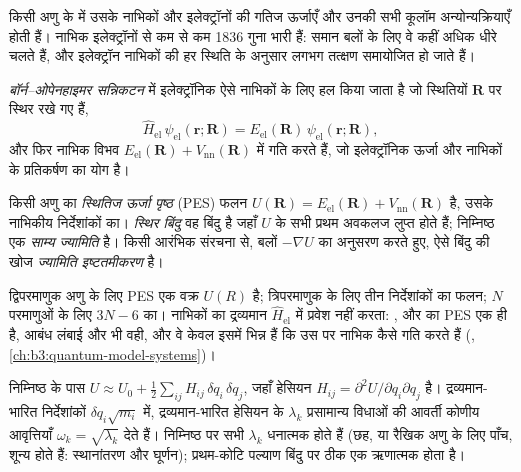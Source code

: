किसी अणु के  में उसके नाभिकों और इलेक्ट्रॉनों की गतिज ऊर्जाएँ
और उनकी सभी कूलॉम अन्योन्यक्रियाएँ होती हैं। नाभिक इलेक्ट्रॉनों से कम से कम 1836
गुना भारी हैं: समान बलों के लिए वे कहीं अधिक धीरे चलते हैं, और
इलेक्ट्रॉन नाभिकों की हर स्थिति के अनुसार लगभग तत्क्षण समायोजित हो जाते हैं।

\begin{definition}\label{def:b3:computational-chemistry:born-oppenheimer}
\emph{बॉर्न--ओपेनहाइमर सन्निकटन} में
इलेक्ट्रॉनिक  ऐसे नाभिकों के लिए हल किया जाता है जो
स्थितियों $\mathbf R$ पर स्थिर रखे गए हैं,
\[
\hat H_{\mathrm{el}}\,\psi_{\mathrm{el}}(\mathbf r;\mathbf R) =
E_{\mathrm{el}}(\mathbf R)\,\psi_{\mathrm{el}}(\mathbf r;\mathbf R),
\]
और फिर नाभिक विभव $E_{\mathrm{el}}(\mathbf R) +
V_{\mathrm{nn}}(\mathbf R)$ में गति करते हैं, जो इलेक्ट्रॉनिक ऊर्जा और नाभिकों
के प्रतिकर्षण का योग है।
\end{definition}

\begin{definition}\label{def:b3:computational-chemistry:pes}
किसी अणु का \emph{स्थितिज ऊर्जा पृष्ठ} (PES)
फलन $U(\mathbf R) = E_{\mathrm{el}}(\mathbf R) +
V_{\mathrm{nn}}(\mathbf R)$ है, उसके नाभिकीय निर्देशांकों का। \emph{स्थिर
बिंदु} वह बिंदु है जहाँ $U$ के सभी प्रथम अवकलज
लुप्त होते हैं; निम्निष्ठ एक \emph{साम्य ज्यामिति} है।
किसी आरंभिक संरचना से, बलों
$-\nabla U$ का अनुसरण करते हुए, ऐसे बिंदु की खोज \emph{ज्यामिति इष्टतमीकरण} है।
\end{definition}

द्विपरमाणुक अणु के लिए PES एक वक्र $U(R)$ है; त्रिपरमाणुक के लिए
तीन निर्देशांकों का फलन; $N$ परमाणुओं के लिए $3N - 6$ का। नाभिकों का
द्रव्यमान $\hat H_{\mathrm{el}}$ में प्रवेश नहीं करता: ,  और  का
PES एक ही है, आबंध लंबाई और  भी वही, और वे केवल इसमें भिन्न हैं कि
उस पर नाभिक कैसे गति करते हैं (, \cref{ch:b3:quantum-model-systems})।

\begin{proposition}[हेसियन से आवृत्तियाँ]\label{prop:b3:computational-chemistry:hessian}
निम्निष्ठ के पास $U \approx U_0 + \frac12\sum_{ij}H_{ij}\,\delta q_i\,\delta q_j$, जहाँ
हेसियन $H_{ij} = \partial^2U/\partial q_i\partial q_j$ है। द्रव्यमान-भारित
निर्देशांकों $\delta q_i\sqrt{m_i}$ में, द्रव्यमान-भारित हेसियन के  $\lambda_k$
प्रसामान्य विधाओं की आवर्ती कोणीय आवृत्तियाँ $\omega_k =
\sqrt{\lambda_k}$ देते हैं। निम्निष्ठ पर सभी $\lambda_k$
धनात्मक होते हैं (छह, या रैखिक अणु के लिए पाँच, शून्य होते हैं: स्थानांतरण और
घूर्णन); प्रथम-कोटि पल्याण बिंदु पर ठीक एक ऋणात्मक होता है।
\end{proposition}

